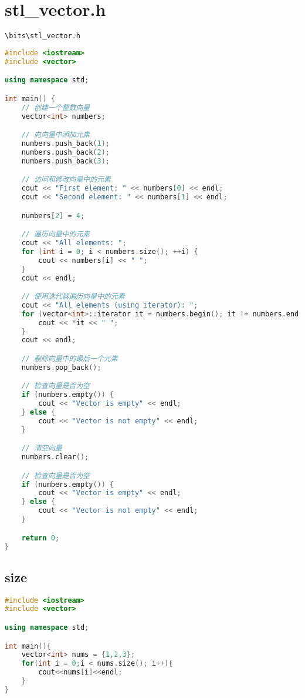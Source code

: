 \documentclass[12pt,twiside,a4paper]{ctexbook}
\numberwithin{chapter}{part}
\begin{document}
\section{stl\_vector.h}
\begin{lstlisting}[language=C++]
\bits\stl_vector.h
\end{lstlisting}
\begin{lstlisting}[language=C++]
#include <iostream>
#include <vector>

using namespace std;

int main() {
    // 创建一个整数向量
    vector<int> numbers;

    // 向向量中添加元素
    numbers.push_back(1);
    numbers.push_back(2);
    numbers.push_back(3);

    // 访问和修改向量中的元素
    cout << "First element: " << numbers[0] << endl;
    cout << "Second element: " << numbers[1] << endl;

    numbers[2] = 4;

    // 遍历向量中的元素
    cout << "All elements: ";
    for (int i = 0; i < numbers.size(); ++i) {
        cout << numbers[i] << " ";
    }
    cout << endl;

    // 使用迭代器遍历向量中的元素
    cout << "All elements (using iterator): ";
    for (vector<int>::iterator it = numbers.begin(); it != numbers.end(); ++it) {
        cout << *it << " ";
    }
    cout << endl;

    // 删除向量中的最后一个元素
    numbers.pop_back();

    // 检查向量是否为空
    if (numbers.empty()) {
        cout << "Vector is empty" << endl;
    } else {
        cout << "Vector is not empty" << endl;
    }

    // 清空向量
    numbers.clear();

    // 检查向量是否为空
    if (numbers.empty()) {
        cout << "Vector is empty" << endl;
    } else {
        cout << "Vector is not empty" << endl;
    }

    return 0;
}
\end{lstlisting}

\subsection{size}
\begin{lstlisting}[language=C++]
#include <iostream>
#include <vector>

using namespace std;

int main(){
	vector<int> nums = {1,2,3};
	for(int i = 0;i < nums.size(); i++){
		cout<<nums[i]<<endl;
	}
}
\end{lstlisting}
\end{document}
